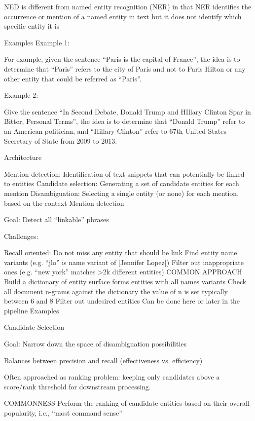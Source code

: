NED is different from named entity recognition (NER) in that NER identifies the occurrence or mention of a named entity in text but it does not identify which specific entity it is

Examples
Example 1:

For example, given the sentence “Paris is the capital of France”, the idea is to determine that “Paris” refers to the city of Paris and not to Paris Hilton or any other entity that could be referred as “Paris”.



Example 2:

Give the sentence “In Second Debate, Donald Trump and HIllary Clinton Spar in Bitter, Personal Terms”, the idea is to determine that “Donald Trump” refer to an American politician, and “Hillary Clinton” refer to 67th United States Secretary of State from 2009 to 2013.



Architecture


Mention detection: Identification of text snippets that can potentially be linked to entities
Candidate selection: Generating a set of candidate entities for each mention
Disambiguation: Selecting a single entity (or none) for each mention, based on the context
Mention detection


Goal: Detect all “linkable” phrases

Challenges:

Recall oriented: Do not miss any entity that should be link
Find entity name variants (e.g. “jlo” is name variant of [Jennifer Lopez])
Filter out inappropriate ones (e.g. “new york” matches >2k different entities)
COMMON APPROACH
Build a dictionary of entity surface forms
entities with all names variants
Check all document n-grams against the dictionary
the value of n is set typically between 6 and 8
Filter out undesired entities
Can be done here or later in the pipeline
Examples



Candidate Selection


Goal: Narrow down the space of disambiguation possibilities

Balances between precision and recall (effectiveness vs. efficiency)

Often approached as ranking problem: keeping only candidates above a score/rank threshold for downstream processing.

COMMONNESS
Perform the ranking of candidate entities based on their overall popularity, i.e., “most command sense”



